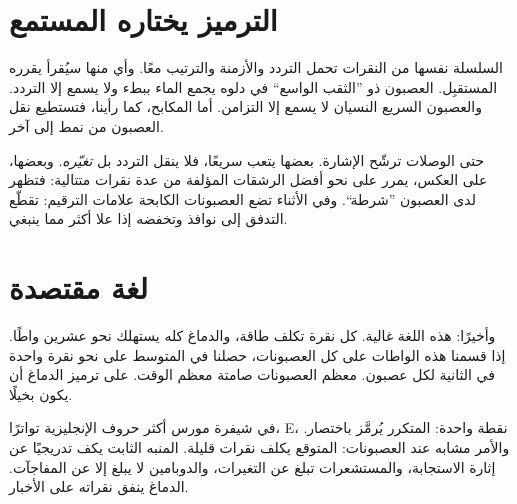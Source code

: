\section*{الترميز يختاره المستمع}

السلسلة نفسها من النقرات تحمل التردد والأزمنة والترتيب معًا. وأي منها سيُقرأ يقرره المستقبِل. العصبون ذو ”الثقب الواسع“ في دلوه يجمع الماء ببطء ولا يسمع إلا التردد. والعصبون السريع النسيان لا يسمع إلا التزامن. أما المكابح، كما رأينا، فتستطيع نقل العصبون من نمط إلى آخر.

حتى الوصلات ترشّح الإشارة. بعضها يتعب سريعًا، فلا ينقل التردد بل \emph{تغيّره}. وبعضها، على العكس، يمرر على نحو أفضل الرشقات المؤلفة من عدة نقرات متتالية: فتظهر لدى العصبون ”شرطة“. وفي الأثناء تضع العصبونات الكابحة علامات الترقيم: تقطّع التدفق إلى نوافذ وتخفضه إذا علا أكثر مما ينبغي.

\section*{لغة مقتصدة}

وأخيرًا: هذه اللغة غالية. كل نقرة تكلف طاقة، والدماغ كله يستهلك نحو عشرين واطًا. إذا قسمنا هذه الواطات على كل العصبونات، حصلنا في المتوسط على نحو نقرة واحدة في الثانية لكل عصبون. معظم العصبونات صامتة معظم الوقت. على ترميز الدماغ أن يكون بخيلًا.

في شيفرة مورس أكثر حروف الإنجليزية تواترًا، \foreignlanguage{english}{E}، نقطة واحدة: المتكرر يُرمَّز باختصار. والأمر مشابه عند العصبونات: المتوقع يكلف نقرات قليلة. المنبه الثابت يكف تدريجيًا عن إثارة الاستجابة، والمستشعرات تبلغ عن التغيرات، والدوبامين لا يبلغ إلا عن المفاجآت. الدماغ ينفق نقراته على الأخبار.


